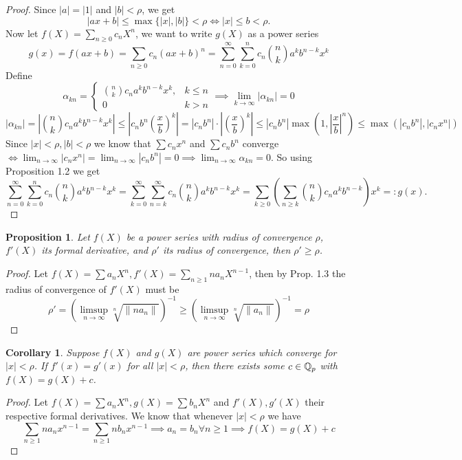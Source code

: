 \documentclass[a4paper]{article}
\theoremstyle{plain}
\newtheorem{prop}[thm]{Proposition}
\newtheorem{Cor}[thm]{Corollary}
\theoremstyle{definition}
\begin{document}
\begin{proof}
  Since $|a| = |1|$ and $|b| < \rho$, we get
  $$|ax + b| \leq \max\{|x|, |b|\} < \rho \iff |x| \leq b < \rho.$$
  Now let $f(X) = \sum_{n \geq 0}c_{n}X^{n}$, we want to write $g(X)$ as a power series
  $$g(x) = f(ax+b) = \sum_{n \geq 0}c_{n}(ax+b)^{n} = \sum_{n = 0}^{\infty} \sum _{k=0}^{n}c_{n}\binom nk a^{k}b^{n-k}x^{k}$$
  Define
  $$\alpha_{kn} = \begin{cases}\binom nk c_{n}a^{k}b^{n-k}x^{k}, & k \leq n \\ 0 & k > n\end{cases} \implies \lim_{k \to \infty}|\alpha_{kn}| = 0$$
  $$|\alpha_{kn}| = \left|\binom nk c_{n}a^{k}b^{n-k}x^{k}\right| \leq \left| c_{n}b^{n} \left(\frac{x}{b}\right)^{k}\right| = \left| c_{n}b^{n}\right| \cdot\left| \left(\frac{x}{b}\right)^{k}\right| \leq |c_{n}b^{n}|\max(1, \left|\frac{x}{b}\right|^{n}) \leq \max(|c_{n}b^{n}|, |c_{n}x^{n}|)$$
  Since $|x| < \rho, |b| < \rho$ we know that $\sum c_{n}x^{n}$ and $\sum c_{n}b^{n}$ converge $\iff \lim_{n \to \infty}|c_{n}x^{n}| = \lim_{n \to \infty}|c_{n}b^{n}| = 0 \implies \lim_{n \to \infty}\alpha_{kn} = 0$. So using Proposition 1.2 we get
$$\sum_{n = 0}^{\infty} \sum _{k=0}^{n}c_{n}\binom nk a^{k}b^{n-k}x^{k} = \sum_{k = 0}^{\infty} \sum _{n=k}^{\infty}c_{n}\binom nk a^{k}b^{n-k}x^{k} = \sum_{k \geq 0}\left( \sum_{n \geq k} \binom nk c_{n}a^{k}b^{n-k}\right)x^{k} =: g(x).$$
\end{proof}
\begin{prop}
  Let $f(X)$ be a power series with radius of convergence $\rho$, $f'(X)$ its formal derivative, and $\rho'$ its radius of convergence, then $\rho' \geq \rho$.
\end{prop}
\begin{proof}
  Let $f(X) = \sum a_{n}X^{n}, f'(X) = \sum_{n \geq 1} na_{n}X^{n-1}$, then by Prop. 1.3 the radius of convergence of $f'(X)$ must be
  $$\rho' = \left( \limsup_{n \to \infty} \sqrt[n]{\|na_{n}\|} \right)^{-1} \geq \left( \limsup_{n \to \infty} \sqrt[n]{\|a_{n}\|} \right)^{-1} = \rho$$
\end{proof}
\begin{Cor} Suppose $f(X)$ and $g(X)$ are power series which converge for $|x| < \rho$. If $f'(x)=g'(x)$ for all $|x| < \rho$, then there exists some $c \in \Bbb Q_{p}$ with $f(X)=g(X)+c$.
\end{Cor}
\begin{proof}
  Let $f(X) = \sum a_{n}X^{n}, g(X) = \sum b_{n}X^{n}$ and $f'(X), g'(X)$ their respective formal derivatives. We know that whenever $|x| < \rho$ we have
  $$\sum_{n \geq 1}na_{n}x^{n-1} = \sum_{n \geq 1}nb_{n}x^{n-1} \implies a_{n} = b_{n} \forall n \geq 1 \implies f(X) = g(X) + c$$
\end{proof}
\end{document}
